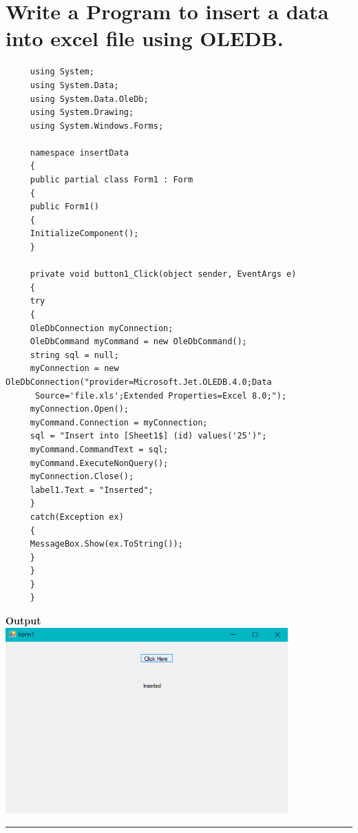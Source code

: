\documentclass[11pt,dvipsnames,cmyk]{article}
\begin{document}
	 \section*{Write a Program to insert a data into excel file using OLEDB.}
	 \begin{verbatim}
	 using System;
	 using System.Data;
	 using System.Data.OleDb;
	 using System.Drawing;
	 using System.Windows.Forms;
	 
	 namespace insertData
	 {
	 public partial class Form1 : Form
	 {
	 public Form1()
	 {
	 InitializeComponent();
	 }
	 
	 private void button1_Click(object sender, EventArgs e)
	 {
	 try
	 {
	 OleDbConnection myConnection;
	 OleDbCommand myCommand = new OleDbCommand();
	 string sql = null;
	 myConnection = new OleDbConnection("provider=Microsoft.Jet.OLEDB.4.0;Data
	  Source='file.xls';Extended Properties=Excel 8.0;");
	 myConnection.Open();
	 myCommand.Connection = myConnection;
	 sql = "Insert into [Sheet1$] (id) values('25')";
	 myCommand.CommandText = sql;
	 myCommand.ExecuteNonQuery();
	 myConnection.Close();
	 label1.Text = "Inserted";
	 }
	 catch(Exception ex)
	 {
	 MessageBox.Show(ex.ToString());
	 }
	 }
	 }
	 }
	 \end{verbatim}
	 \begin{center}
	 	\textbf{Output}\\
	 	\hfill\break\includegraphics[width=4.27in]{8.png}
	 \end{center}
	 \rule{6.27in}{1.2pt}
	 
\end{document}
